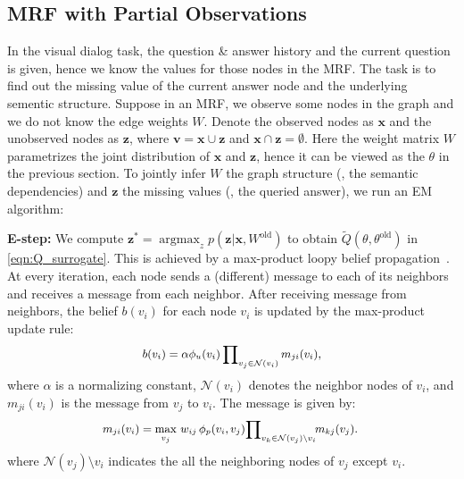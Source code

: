 \documentclass[10pt,twocolumn,letterpaper]{article}
\DeclareMathOperator*{\argmax}{argmax}
\begin{document}
\subsection{MRF with Partial Observations}
In the visual dialog task, the question \& answer history and the current question is given, hence we know the values for those nodes in the MRF. The task is to find out the missing value of the current answer node and the underlying sementic structure. Suppose in an MRF, we observe some nodes in the graph and we do not know the edge weights $W$. Denote the observed nodes as $\bm{x}$ and the unobserved nodes as $\bm{z}$, where $\bm{v} = \bm{x} \cup \bm{z}$ and $\bm{x} \cap \bm{z} = \emptyset$. Here the weight matrix $W$ parametrizes the joint distribution of $\bm{x}$ and $\bm{z}$, hence it can be viewed as the $\theta$ in the previous section. To jointly infer $W$ the graph structure (\eg, the semantic dependencies) and $\bm{z}$ the missing values (\eg, the queried answer), we run an EM algorithm:

\noindent\textbf{E-step:} We compute $\bm{z}^{*} = \argmax_z p(\bm{z} | \bm{x}, W^{\text{old}})$ to obtain $\tilde{Q}(\theta, \theta^{\text{old}})$ in \autoref{eqn:Q_surrogate}. This is achieved by a max-product loopy belief propagation~\cite{weiss2001optimality}. At every iteration, each node sends a (different) message to each of its neighbors and receives a message from each neighbor. After receiving message from neighbors, the belief $b(v_{i})$ for each node $v_{i}$ is updated by the max-product update rule:
\vspace{-2pt}
\begin{equation}\small
\begin{aligned}
b(v_{i}) = \alpha \phi_{u} (v_{i}) \prod\nolimits_{v_{j} \in \mathcal{N}(v_{i})} m_{ji}(v_i),
\end{aligned}
\vspace{-2pt}
\end{equation}
where $\alpha$ is a normalizing constant, $\mathcal{N}(v_{i})$ denotes the neighbor nodes of $v_{i}$, and $m_{ji}(v_i)$ is the message from $v_{j}$ to $v_{i}$. The message is given by:
\vspace*{-2pt}
\begin{equation}\small
\begin{aligned}
\!\!m_{ji}(v_i) = \max_{v_j} \, w_{ij} \, \phi_{p}(v_{i}, v_{j}) \!\prod\nolimits_{v_k \in \mathcal{N}(v_{j}) \setminus v_{i}} \!\!m_{kj}(v_{j}).
\end{aligned}
\vspace*{-4pt}
\end{equation}
where $\mathcal{N}(v_{j}) \setminus v_{i}$ indicates the all the neighboring nodes of $v_{j}$ except $v_{i}$.
\end{document}
